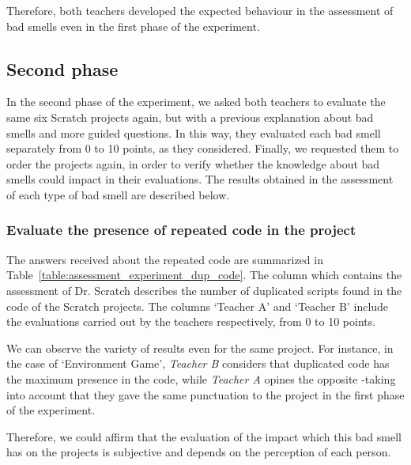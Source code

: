 Therefore, both teachers developed the expected behaviour in the assessment of bad smells even in the first phase of the experiment.


\subsection{Second phase}
\label{subsec:second_phase_experiment}

In the second phase of the experiment, we asked both teachers to evaluate the same six Scratch projects again, but with a previous explanation about bad smells and more guided questions. In this way, they evaluated each bad smell separately from 0 to 10 points, as they considered. Finally, we requested them to order the projects again, in order to verify whether the knowledge about bad smells could impact in their evaluations. The results obtained in the assessment of each type of bad smell are described below.


\subsubsection{Evaluate the presence of repeated code in the project}
\label{subsubsec:duplicated_code_experiment}

The answers received about the repeated code are summarized in Table~\ref{table:assessment_experiment_dup_code}. The column which contains the assessment of Dr. Scratch describes the number of duplicated scripts found in the code of the Scratch projects. The columns `Teacher A' and `Teacher B' include the evaluations carried out by the teachers respectively, from 0 to 10 points.

We can observe the variety of results even for the same project. For instance, in the case of `Environment Game', \textit{Teacher B} considers that duplicated code has the maximum presence in the code, while \textit{Teacher A} opines the opposite -taking into account that they gave the same punctuation to the project in the first phase of the experiment.

Therefore, we could affirm that the evaluation of the impact which this bad smell has on the projects is subjective and depends on the perception of each person.



